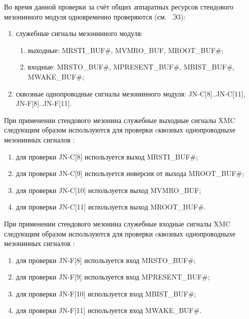      \subpoint Во время данной проверки за счёт общих аппаратных ресурсов стендового мезонинного модуля одновременно проверяются (см. \DocStendMezSignature~Э3):
      \begin{enumerate}
	\item служебные сигналы мезонинного модуля:
	  \begin{enumerate}
	    \item выходные: MRSTI\_BUF\#, MVMRO\_BUF, MROOT\_BUF\#;
	    \item входные: MRSTO\_BUF\#, MPRESENT\_BUF\#, MBIST\_BUF\#, MWAKE\_BUF\#;
	  \end{enumerate}
	\item сквозные однопроводные сигналы мезонинного модуля: JN-C[8]..JN-C[11], JN-F[8]..JN-F[11].
      \end{enumerate}      
     
    \subpoint При применении стендового мезонина \DocStendMezSignature служебные выходные сигналы XMC следующим образом используются 
	      для проверки cквозных однопроводныхе мезонинных сигналов \DocProductShortTitle:
      \begin{enumerate}
	\item для проверки JN-C[8]  используется выход \DocProductShortTitle MRSTI\_BUF\#;
	\item для проверки JN-C[9]  используется инверсия от выхода \DocProductShortTitle MROOT\_BUF\#;
	\item для проверки JN-C[10] используется выход \DocProductShortTitle MVMRO\_BUF;
	\item для проверки JN-C[11] используется выход \DocProductShortTitle MROOT\_BUF\#.
      \end{enumerate}      
    
    \subpoint При применении стендового мезонина \DocStendMezSignature служебные входные сигналы XMC следующим образом используются 
	      для проверки cквозных однопроводныхе мезонинных сигналов \DocProductShortTitle:
      \begin{enumerate}
	\item для проверки JN-F[8]  используется вход \DocProductShortTitle MRSTO\_BUF\#;
	\item для проверки JN-F[9]  используется вход \DocProductShortTitle MPRESENT\_BUF\#;
	\item для проверки JN-F[10] используется вход \DocProductShortTitle MBIST\_BUF\#;
	\item для проверки JN-F[11] используется вход \DocProductShortTitle MWAKE\_BUF\#.
      \end{enumerate}    
    
